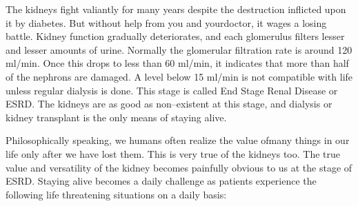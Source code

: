 \vskip 2pt

The kidneys fight valiantly for many years despite the destruc\-tion inflicted upon it by diabetes. But without help from you and your\break doctor, it wages a losing battle. Kidney function gradually deteriorates, and each glomerulus filters lesser and lesser amounts of urine. Normally the glomerular filtration rate is around 120 ml/min. Once this drops to less than 60 ml/min, it indicates that more than half of the nephrons are damaged. A level below 15 ml/min is not compatible with life unless regular dialysis is done. This stage is called End Stage Renal Disease or ESRD. The kidneys are as good as non–existent at this stage, and dialysis or kidney transplant is the only means of staying alive.

\vskip 2pt

Philosophically speaking, we humans often realize the value of\break many things in our life only after we have lost them. This is very true of the kidneys too. The true value and versatility of the kidney becomes painfully obvious to us at the stage of ESRD. Staying alive becomes a daily challenge as patients experience the following life threatening situations on a daily basis:

